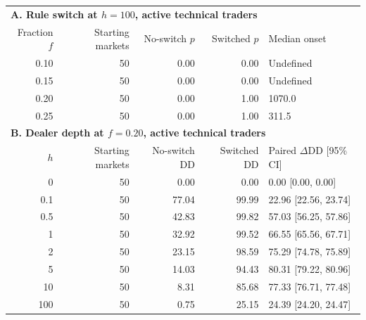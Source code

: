 \begin{center}
\begin{minipage}{\linewidth}\centering
\captionsetup{type=table,hypcap=false}
\caption{Paired rule switches on a $64\times64$ grid over 3,000 post-switch steps. In A, majority probability $p$ is the fraction of markets reaching an interior Sell fraction of at least one-half; median onset is conditional on reaching that value. Undefined means no run reached a majority. In B, DD is median maximum drawdown in percent. $\Delta$DD is the median paired difference, in percentage points, with a pointwise 95\% whole-market bootstrap confidence interval (CI). These contrasts separate the rule switch from baseline financial variation.}
\label{tab:paired-switch}
\small\setlength{\tabcolsep}{4pt}
\begin{tabular}{rrrrl}
\toprule
\multicolumn{5}{l}{\textbf{A. Rule switch at $h=100$, active technical traders}} \\
Fraction $f$ & Starting markets & No-switch $p$ & Switched $p$ & Median onset \\
0.10 & 50 & 0.00 & 0.00 & Undefined \\
0.15 & 50 & 0.00 & 0.00 & Undefined \\
0.20 & 50 & 0.00 & 1.00 & 1070.0 \\
0.25 & 50 & 0.00 & 1.00 & 311.5 \\
\midrule
\multicolumn{5}{l}{\textbf{B. Dealer depth at $f=0.20$, active technical traders}} \\
$h$ & Starting markets & No-switch DD & Switched DD & Paired $\Delta$DD [95\% CI] \\
0 & 50 & 0.00 & 0.00 & 0.00 [0.00, 0.00] \\
0.1 & 50 & 77.04 & 99.99 & 22.96 [22.56, 23.74] \\
0.5 & 50 & 42.83 & 99.82 & 57.03 [56.25, 57.86] \\
1 & 50 & 32.92 & 99.52 & 66.55 [65.56, 67.71] \\
2 & 50 & 23.15 & 98.59 & 75.29 [74.78, 75.89] \\
5 & 50 & 14.03 & 94.43 & 80.31 [79.22, 80.96] \\
10 & 50 & 8.31 & 85.68 & 77.33 [76.71, 77.48] \\
100 & 50 & 0.75 & 25.15 & 24.39 [24.20, 24.47] \\
\bottomrule
\end{tabular}
\end{minipage}
\end{center}


